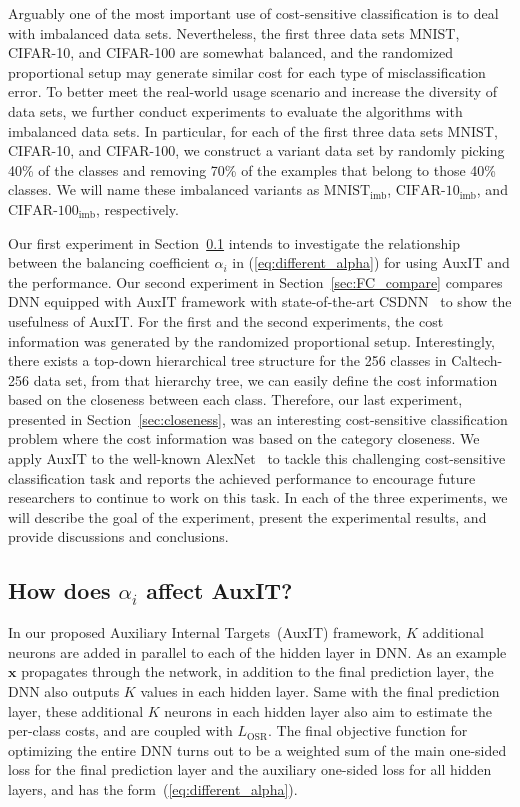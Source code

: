 \documentclass[a4paper]{article}
\begin{document}
  Arguably one of the most important use of cost-sensitive classification is to deal with imbalanced data sets.
  Nevertheless, the first three data sets MNIST, CIFAR-10, and CIFAR-100 are somewhat balanced, and the randomized proportional setup may generate similar cost for each type of misclassification error.
  To better meet the real-world usage scenario and increase the diversity of data sets, we further conduct experiments to evaluate the algorithms with imbalanced data sets.
  In particular, for each of the first three data sets MNIST, CIFAR-10, and CIFAR-100, we construct a variant data set by randomly picking 40\% of the classes and removing 70\% of the examples that belong to those 40\% classes.
  We will name these imbalanced variants as $\mathrm{MNIST}_{\mathrm{imb}}$, $\mathrm{CIFAR}$-$\mathrm{10}_{\mathrm{imb}}$, and $\mathrm{CIFAR}$-$\mathrm{100}_{\mathrm{imb}}$, respectively.

  Our first experiment in Section~\ref{sec:alpha_perf_relation} intends to investigate the relationship between the balancing coefficient $\alpha_{i}$ in (\ref{eq:different_alpha}) for using AuxIT and the performance.
  Our second experiment in Section~\ref{sec:FC_compare} compares DNN equipped with AuxIT framework with state-of-the-art CSDNN~\cite{YC2016} to show the usefulness of AuxIT.
  For the first and the second experiments, the cost information was generated by the randomized proportional setup.
  Interestingly, there exists a top-down hierarchical tree structure for the 256 classes in Caltech-256 data set, from that hierarchy tree, we can easily define the cost information based on the closeness between each class.
  Therefore, our last experiment, presented in Section~\ref{sec:closeness}, was an interesting cost-sensitive classification problem where the cost information was based on the category closeness.
  We apply AuxIT to the well-known AlexNet~\cite{krizhevsky2012imagenet} to tackle this challenging cost-sensitive classification task and reports the achieved performance to encourage future researchers to continue to work on this task.
  In each of the three experiments, we will describe the goal of the experiment, present the experimental results, and provide discussions and conclusions.

\subsection{How does $\alpha_{i}$ affect AuxIT?}
  \label{sec:alpha_perf_relation}
  In our proposed Auxiliary Internal Targets~(AuxIT) framework, $K$ additional neurons are added in parallel to each of the hidden layer in DNN.
  As an example $\mathbf{x}$ propagates through the network, in addition to the final prediction layer, the DNN also outputs $K$ values in each hidden layer.
  Same with the final prediction layer, these additional $K$ neurons in each hidden layer also aim to estimate the per-class costs, and are coupled with $L_{\mathrm{OSR}}$.
  The final objective function for optimizing the entire DNN turns out to be a weighted sum of the main one-sided loss for the final prediction layer and the auxiliary one-sided loss for all hidden layers, and has the form~(\ref{eq:different_alpha}).
\end{document}
